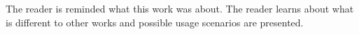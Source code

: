 The reader is reminded what this work was about. The reader learns about what is
different to other works and possible usage scenarios are presented.
% 
% 
% 
% 
% 
% 
% 
% 
